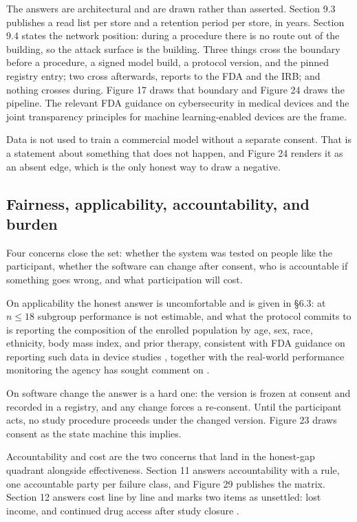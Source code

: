 The answers are architectural and are drawn rather than asserted. Section 9.3
publishes a read list per store and a retention period per store, in years.
Section 9.4 states the network position: during a procedure there is no route
out of the building, so the attack surface is the building. Three things cross
the boundary before a procedure, a signed model build, a protocol version, and
the pinned registry entry; two cross afterwards, reports to the FDA and the IRB;
and nothing crosses during. Figure 17 draws that boundary and Figure 24 draws
the pipeline. The relevant FDA guidance on cybersecurity in medical devices
\cite{FDACyber2026} and the joint transparency principles for machine
learning-enabled devices \cite{FDATrans2024} are the frame.

Data is not used to train a commercial model without a separate consent. That is
a statement about something that does not happen, and Figure 24 renders it as an
absent edge, which is the only honest way to draw a negative.

\subsection{Fairness, applicability, accountability, and burden}

Four concerns close the set: whether the system was tested on people like the
participant, whether the software can change after consent, who is accountable
if something goes wrong, and what participation will cost.

On applicability the honest answer is uncomfortable and is given in \S6.3: at
$n \leq 18$ subgroup performance is not estimable, and what the protocol commits
to is reporting the composition of the enrolled population by age, sex, race,
ethnicity, body mass index, and prior therapy, consistent with FDA guidance on
reporting such data in device studies \cite{FDADiver2017}, together with the
real-world performance monitoring the agency has sought comment on
\cite{FDARealW2025}.

On software change the answer is a hard one: the version is frozen at consent
and recorded in a registry, and any change forces a re-consent. Until the
participant acts, no study procedure proceeds under the changed version.
Figure 23 draws consent as the state machine this implies.

Accountability and cost are the two concerns that land in the honest-gap
quadrant alongside effectiveness. Section 11 answers accountability with a rule,
one accountable party per failure class, and Figure 29 publishes the matrix.
Section 12 answers cost line by line and marks two items as unsettled: lost
income, and continued drug access after study closure \cite{NCICosts2024}.

